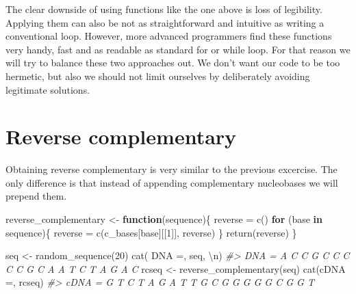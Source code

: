 \documentclass[
]{book}
\newenvironment{Shaded}{\begin{snugshade}}{\end{snugshade}}
\newcommand{\CommentTok}[1]{\textcolor[rgb]{0.56,0.35,0.01}{\textit{#1}}}
\newcommand{\ControlFlowTok}[1]{\textcolor[rgb]{0.13,0.29,0.53}{\textbf{#1}}}
\newcommand{\DecValTok}[1]{\textcolor[rgb]{0.00,0.00,0.81}{#1}}
\newcommand{\FunctionTok}[1]{\textcolor[rgb]{0.00,0.00,0.00}{#1}}
\newcommand{\NormalTok}[1]{#1}
\newcommand{\OtherTok}[1]{\textcolor[rgb]{0.56,0.35,0.01}{#1}}
\newcommand{\SpecialCharTok}[1]{\textcolor[rgb]{0.00,0.00,0.00}{#1}}
\newcommand{\StringTok}[1]{\textcolor[rgb]{0.31,0.60,0.02}{#1}}
\begin{document}
The clear downside of using functions like the one above is loss of legibility. Applying them can also be not as straightforward and intuitive as writing a conventional loop. However, more advanced programmers find these functions very handy, fast and as readable as standard for or while loop. For that reason we will try to balance these two approaches out. We don't want our code to be too hermetic, but also we should not limit ourselves by deliberately avoiding legitimate solutions.

\hypertarget{reverse-complementary}{%
\section{Reverse complementary}\label{reverse-complementary}}

Obtaining reverse complementary is very similar to the previous excercise. The only difference is that instead of appending complementary nucleobases we will prepend them.

\begin{Shaded}
\begin{Highlighting}[]
\NormalTok{reverse\_complementary }\OtherTok{\textless{}{-}} \ControlFlowTok{function}\NormalTok{(sequence)\{}
\NormalTok{  reverse }\OtherTok{=} \FunctionTok{c}\NormalTok{()}
  \ControlFlowTok{for}\NormalTok{ (base }\ControlFlowTok{in}\NormalTok{ sequence)\{}
\NormalTok{    reverse }\OtherTok{=} \FunctionTok{c}\NormalTok{(c\_bases[base][[}\DecValTok{1}\NormalTok{]], reverse)}
\NormalTok{  \}}
  \FunctionTok{return}\NormalTok{(reverse)}
\NormalTok{\}}
\end{Highlighting}
\end{Shaded}

\begin{Shaded}
\begin{Highlighting}[]
\NormalTok{seq }\OtherTok{\textless{}{-}} \FunctionTok{random\_sequence}\NormalTok{(}\DecValTok{20}\NormalTok{)}
\FunctionTok{cat}\NormalTok{(}\StringTok{\textquotesingle{} DNA =\textquotesingle{}}\NormalTok{, seq, }\StringTok{\textquotesingle{}}\SpecialCharTok{\textbackslash{}n}\StringTok{\textquotesingle{}}\NormalTok{)}
\CommentTok{\#\textgreater{}  DNA = A C C G C C C C C G C A A T C T A G A C}
\NormalTok{rcseq }\OtherTok{\textless{}{-}} \FunctionTok{reverse\_complementary}\NormalTok{(seq)}
\FunctionTok{cat}\NormalTok{(}\StringTok{\textquotesingle{}cDNA =\textquotesingle{}}\NormalTok{, rcseq)}
\CommentTok{\#\textgreater{} cDNA = G T C T A G A T T G C G G G G G C G G T}
\end{Highlighting}
\end{Shaded}
\end{document}
